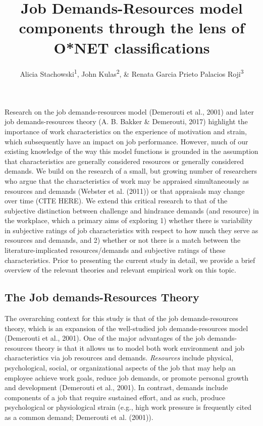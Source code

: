 \documentclass[
  english,
  man]{apa6}
\title{Job Demands-Resources model components through the lens of O*NET classifications}
\author{Alicia Stachowski\textsuperscript{1}, John Kulas\textsuperscript{2}, \& Renata Garcia Prieto Palacios Roji\textsuperscript{3}}
\date{}
\affiliation{\vspace{0.5cm}\textsuperscript{1} University of Wisconsin - Stout\\\textsuperscript{2} eRg\\\textsuperscript{3} PepsiCo}
\begin{document}
\maketitle

Research on the job demands-resources model (Demerouti et al., 2001) and later job demands-resources theory (A. B. Bakker \& Demerouti, 2017) highlight the importance of work characteristics on the experience of motivation and strain, which subsequently have an impact on job performance. However, much of our existing knowledge of the way this model functions is grounded in the assumption that characteristics are generally considered resources or generally considered demands. We build on the research of a small, but growing number of researchers who argue that the characteristics of work may be appraised simultaneously as resources and demands (Webster et al. (2011)) or that appraisals may change over time (CITE HERE). We extend this critical research to that of the subjective distinction between challenge and hindrance demands (and resource) in the workplace, which a primary aims of exploring 1) whether there is variability in subjective ratings of job characteristics with respect to how much they serve as resources and demands, and 2) whether or not there is a match between the literature-implicated resources/demands and subjective ratings of these characteristics. Prior to presenting the current study in detail, we provide a brief overview of the relevant theories and relevant empirical work on this topic.

\hypertarget{the-job-demands-resources-theory}{%
\subsection{The Job demands-Resources Theory}\label{the-job-demands-resources-theory}}

The overarching context for this study is that of the job demands-resources theory, which is an expansion of the well-studied job demands-resources model (Demerouti et al., 2001). One of the major advantages of the job demands-resources theory is that it allows us to model both work environment and job characteristics via job resources and demands. \emph{Resources} include physical, psychological, social, or organizational aspects of the job that may help an employee achieve work goals, reduce job demands, or promote personal growth and development (Demerouti et al., 2001). In contrast, demands include components of a job that require sustained effort, and as such, produce psychological or physiological strain (e.g., high work pressure is frequently cited as a common demand; Demerouti et al. (2001)).
\end{document}
